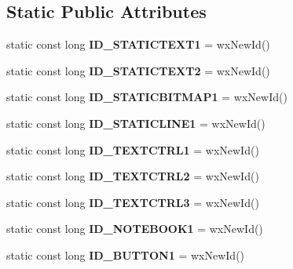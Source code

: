 \subsection*{Static Public Attributes}
\begin{DoxyCompactItemize}
\item 
\mbox{\label{classCAboutBox_a8a8c71cf80bae706d4dcab85ea36330f}} 
static const long {\bfseries I\+D\+\_\+\+S\+T\+A\+T\+I\+C\+T\+E\+X\+T1} = wx\+New\+Id()
\item 
\mbox{\label{classCAboutBox_ad9232b25d16dc3fd4118b66356de9835}} 
static const long {\bfseries I\+D\+\_\+\+S\+T\+A\+T\+I\+C\+T\+E\+X\+T2} = wx\+New\+Id()
\item 
\mbox{\label{classCAboutBox_a0a488920494fd9877808ab6161460f50}} 
static const long {\bfseries I\+D\+\_\+\+S\+T\+A\+T\+I\+C\+B\+I\+T\+M\+A\+P1} = wx\+New\+Id()
\item 
\mbox{\label{classCAboutBox_a37f53de8b8107dd06c492ede246d1666}} 
static const long {\bfseries I\+D\+\_\+\+S\+T\+A\+T\+I\+C\+L\+I\+N\+E1} = wx\+New\+Id()
\item 
\mbox{\label{classCAboutBox_a0d649c670b29575cdbfc1f1a1a6ad177}} 
static const long {\bfseries I\+D\+\_\+\+T\+E\+X\+T\+C\+T\+R\+L1} = wx\+New\+Id()
\item 
\mbox{\label{classCAboutBox_a6c8d3fabb2794f7bacfcf641aaf23abb}} 
static const long {\bfseries I\+D\+\_\+\+T\+E\+X\+T\+C\+T\+R\+L2} = wx\+New\+Id()
\item 
\mbox{\label{classCAboutBox_ab111166245ba1ed7e7a51820faf25aa3}} 
static const long {\bfseries I\+D\+\_\+\+T\+E\+X\+T\+C\+T\+R\+L3} = wx\+New\+Id()
\item 
\mbox{\label{classCAboutBox_a1b9b6bcf1535e4ba4a6f122d59c74f20}} 
static const long {\bfseries I\+D\+\_\+\+N\+O\+T\+E\+B\+O\+O\+K1} = wx\+New\+Id()
\item 
\mbox{\label{classCAboutBox_a709e9b214b7b73ecd7f194d1212ba872}} 
static const long {\bfseries I\+D\+\_\+\+B\+U\+T\+T\+O\+N1} = wx\+New\+Id()
\end{DoxyCompactItemize}
